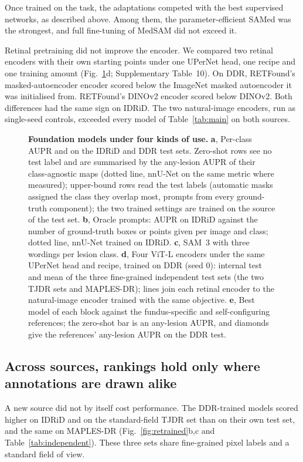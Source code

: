 Once trained on the task, the adaptations competed with the best supervised networks, as described above. Among them, the parameter-efficient SAMed was the strongest, and full fine-tuning of MedSAM did not exceed it.

Retinal pretraining did not improve the encoder. We compared two retinal encoders with their own starting points under one UPerNet head, one recipe and one training amount (Fig.~\ref{fig:foundation}d; Supplementary Table~10). On DDR, RETFound's masked-autoencoder encoder scored  below the ImageNet masked autoencoder\cite{he2022mae} it was initialised from. RETFound's DINOv2 encoder scored  below DINOv2\cite{oquab2024dinov2}. Both differences had the same sign on IDRiD. The two natural-image encoders, run as single-seed controls, exceeded every model of Table~\ref{tab:main} on both sources.

\begin{figure}[t]
\centering
{}
\caption{\textbf{Foundation models under four kinds of use.} \textbf{a}, Per-class AUPR and \mAUPR{} on the IDRiD and DDR test sets. Zero-shot rows see no test label and are summarised by the any-lesion AUPR of their class-agnostic maps (dotted line, nnU-Net on the same metric where measured); upper-bound rows read the test labels (automatic masks assigned the class they overlap most, prompts from every ground-truth component); the two trained settings are trained on the source of the test set. \textbf{b}, Oracle prompts: AUPR on IDRiD against the number of ground-truth boxes or points given per image and class; dotted line, nnU-Net trained on IDRiD. \textbf{c}, SAM~3 with three wordings per lesion class. \textbf{d}, Four ViT-L encoders under the same UPerNet head and recipe, trained on DDR (seed 0): internal test and mean of the three fine-grained independent test sets (the two TJDR sets and MAPLES-DR); lines join each retinal encoder to the natural-image encoder trained with the same objective. \textbf{e}, Best model of each block against the fundus-specific and self-configuring references; the zero-shot bar is an any-lesion AUPR, and diamonds give the references' any-lesion AUPR on the DDR test.}
\label{fig:foundation}
\end{figure}



\subsection{Across sources, rankings hold only where annotations are drawn alike}
A new source did not by itself cost performance. The DDR-trained models scored higher on IDRiD and on the standard-field TJDR set than on their own test set, and the same on MAPLES-DR (Fig.~\ref{fig:retrained}b,c and Table~\ref{tab:independent}). These three sets share fine-grained pixel labels and a standard field of view.

